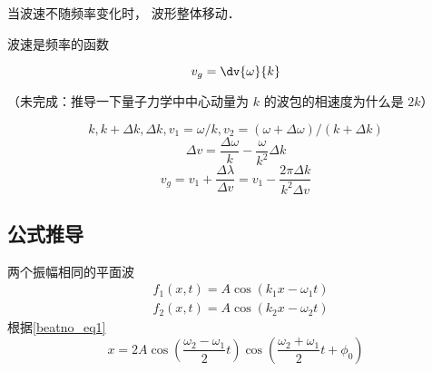 
\begin{issues}
\issueDraft
\end{issues}


当波速不随频率变化时， 波形整体移动．

波速是频率的函数

\begin{equation}
v_g = \dv{\omega}{k}
\end{equation}

（未完成：推导一下量子力学中中心动量为 $k$ 的波包的相速度为什么是 $2k$）

\begin{equation}
k, k+\Delta k, \Delta k, v_1 = \omega/k, v_2 = (\omega+\Delta\omega)/(k+\Delta k)
\end{equation}
\begin{equation}
\Delta v = \frac{\Delta \omega}{k} - \frac{\omega}{k^2}\Delta k
\end{equation}
\begin{equation}
v_g = v_1 + \frac{\Delta \lambda}{\Delta v} = v_1 - \frac{2\pi\Delta k}{k^2\Delta v}
\end{equation}

\subsection{公式推导}
两个振幅相同的平面波
\begin{equation}
\begin{aligned}
&f_1(x,t) = A\cos(k_1 x - \omega_1 t)\\
&f_2(x,t) = A\cos(k_2 x - \omega_2 t)
\end{aligned}
\end{equation}
根据\autoref{beatno_eq1}~
\begin{equation}
x=2 A \cos \left(\frac{\omega_{2}-\omega_{1}}{2} t\right) \cos \left(\frac{\omega_{2}+\omega_{1}}{2} t+\phi_{0}\right)
\end{equation}


